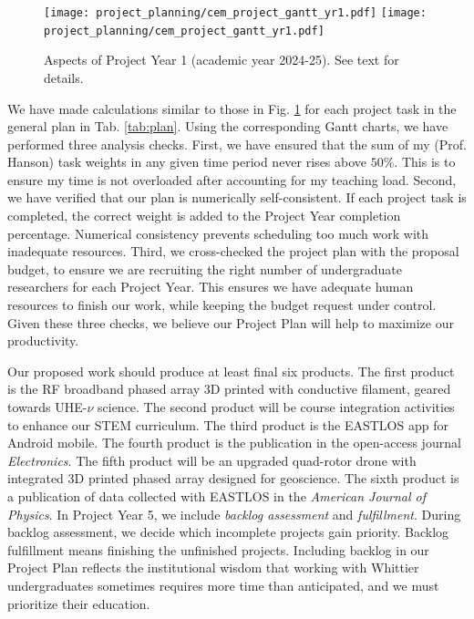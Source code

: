 \documentclass[../../main.tex]{subfiles}
\begin{document}
\begin{figure}
\centering
\texttt{[image: project\_planning/cem\_project\_gantt\_yr1.pdf]}
\texttt{[image: project\_planning/cem\_project\_gantt\_yr1.pdf]}
\caption{\label{fig:gantt_1} Aspects of Project Year 1 (academic year 2024-25).  See text for details.}
\end{figure}

We have made calculations similar to those in Fig. \ref{fig:gantt_1} for each project task in the general plan in Tab. \ref{tab:plan}.  Using the corresponding Gantt charts, we have performed three analysis checks.  First, we have ensured that the sum of my (Prof. Hanson) task weights in any given time period never rises above $50\%$.  This is to ensure my time is not overloaded after accounting for my teaching load.  Second, we have verified that our plan is numerically self-consistent.  If each project task is completed, the correct weight is added to the Project Year completion percentage.  Numerical consistency prevents scheduling too much work with inadequate resources.  Third, we cross-checked the project plan with the proposal budget, to ensure we are recruiting the right number of undergraduate researchers for each Project Year.  This ensures we have adequate human resources to finish our work, while keeping the budget request under control.  Given these three checks, we believe our Project Plan will help to maximize our productivity. \\ \vspace{2.5mm}

Our proposed work should produce at least final six products.  The first product is the RF broadband phased array 3D printed with conductive filament, geared towards UHE-$\nu$ science.  The second product will be course integration activities to enhance our STEM curriculum.  The third product is the EASTLOS app for Android mobile.  The fourth product is the publication in the open-access journal \textit{Electronics}.  The fifth product will be an upgraded quad-rotor drone with integrated 3D printed phased array designed for geoscience.  The sixth product is a publication of data collected with EASTLOS in the \textit{American Journal of Physics}.  In Project Year 5, we include \textit{backlog assessment} and \textit{fulfillment}.  During backlog assessment, we decide which incomplete projects gain priority.  Backlog fulfillment means finishing the unfinished projects.  Including backlog in our Project Plan reflects the institutional wisdom that working with Whittier undergraduates sometimes requires more time than anticipated, and we must prioritize their education.
\end{document}
